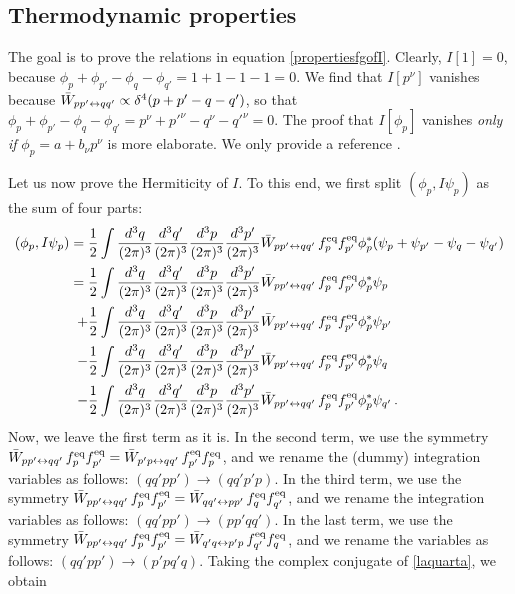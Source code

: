 \documentclass[a4paper, amsfonts, amssymb, amsmath, reprint, showkeys, nofootinbib, twoside, onecolumn,notitlepage]{revtex4-2}
\theoremstyle{definition}
\theoremstyle{theorem}
\theoremstyle{corollary}
\begin{document}
\subsection{Thermodynamic properties}\label{thermoprop}

The goal is to prove the relations in equation \eqref{propertiesfgofI}. Clearly, $I[1]=0$, because $\phi_p+\phi_{p'}-\phi_q-\phi_{q'}=1+1-1-1=0$. We find that $I[p^\nu]$ vanishes because $\Bar{W}_{pp'\leftrightarrow qq'}\propto \delta^4(p+p'-q-q')$, so that $\phi_p+\phi_{p'}-\phi_q-\phi_{q'}=p^\nu+p'^\nu-q^\nu-q'^\nu=0$. The proof that $I[\phi_p]$ vanishes \textit{only if} $\phi_p=a+b_\nu p^\nu$ is more elaborate. We only provide a reference \cite[Ch IX, \S 1]{Groot1980RelativisticKT}.
 
Let us now prove the Hermiticity of $I$. To this end, we first split $(\phi_p,I\psi_p)$ as the sum of four parts:
\begin{equation}\label{laquarta}
\begin{split}
(\phi_p,I\psi_p) = {}& \dfrac{1}{2} \int \dfrac{d^3 q}{(2\pi)^3} \dfrac{d^3 q'}{(2\pi)^3} \dfrac{d^3 p}{(2\pi)^3}\dfrac{d^3 p'}{(2\pi)^3}  \Bar{W}_{pp'\leftrightarrow qq'} \,  f^{\text{eq}}_{p} f^{\text{eq}}_{p'} \phi_p^* (\psi_p+\psi_{p'}-\psi_q-\psi_{q'}) \\
= {}& \dfrac{1}{2} \int \dfrac{d^3 q}{(2\pi)^3} \dfrac{d^3 q'}{(2\pi)^3} \dfrac{d^3 p}{(2\pi)^3}\dfrac{d^3 p'}{(2\pi)^3}  \Bar{W}_{pp'\leftrightarrow qq'} \,  f^{\text{eq}}_{p} f^{\text{eq}}_{p'} \phi_p^* \psi_p \\
+{}& \dfrac{1}{2} \int \dfrac{d^3 q}{(2\pi)^3} \dfrac{d^3 q'}{(2\pi)^3} \dfrac{d^3 p}{(2\pi)^3}\dfrac{d^3 p'}{(2\pi)^3}  \Bar{W}_{pp'\leftrightarrow qq'} \,  f^{\text{eq}}_{p} f^{\text{eq}}_{p'} \phi_p^* \psi_{p'} \\
-{}&\dfrac{1}{2} \int \dfrac{d^3 q}{(2\pi)^3} \dfrac{d^3 q'}{(2\pi)^3} \dfrac{d^3 p}{(2\pi)^3}\dfrac{d^3 p'}{(2\pi)^3}  \Bar{W}_{pp'\leftrightarrow qq'} \,  f^{\text{eq}}_{p} f^{\text{eq}}_{p'} \phi_p^* \psi_q \\
-{}& \dfrac{1}{2} \int \dfrac{d^3 q}{(2\pi)^3} \dfrac{d^3 q'}{(2\pi)^3} \dfrac{d^3 p}{(2\pi)^3}\dfrac{d^3 p'}{(2\pi)^3}  \Bar{W}_{pp'\leftrightarrow qq'} \,  f^{\text{eq}}_{p} f^{\text{eq}}_{p'} \phi_p^* \psi_{q'} \, . \\
\end{split}
\end{equation}
Now, we leave the first term as it is. In the second term, we use the symmetry $\Bar{W}_{pp'\leftrightarrow qq'} \,  f^{\text{eq}}_{p} f^{\text{eq}}_{p'}=\Bar{W}_{p'p\leftrightarrow qq'} \,  f^{\text{eq}}_{p'} f^{\text{eq}}_{p}$, and we rename the (dummy) integration variables as follows: $(qq'pp')\rightarrow (qq'p'p)$. In the third term, we use the symmetry $\Bar{W}_{pp'\leftrightarrow qq'} \,  f^{\text{eq}}_{p} f^{\text{eq}}_{p'}=\Bar{W}_{qq'\leftrightarrow pp'} \,  f^{\text{eq}}_{q} f^{\text{eq}}_{q'}$, and we rename the integration variables as follows: $(qq'pp')\rightarrow (pp'qq')$. In the last term, we use the symmetry $\Bar{W}_{pp'\leftrightarrow qq'} \,  f^{\text{eq}}_{p} f^{\text{eq}}_{p'}= \Bar{W}_{q'q\leftrightarrow p'p} \,  f^{\text{eq}}_{q'} f^{\text{eq}}_{q}$, and we rename the variables as follows: $(qq'pp')\rightarrow (p'pq'q)$. Taking the complex conjugate of \eqref{laquarta}, we obtain
\end{document}
